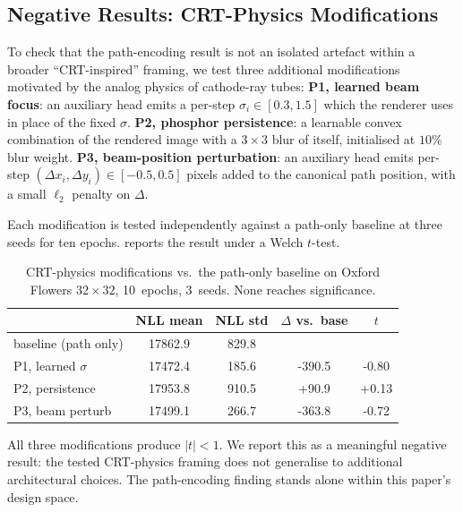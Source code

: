 \documentclass[conference]{IEEEtran}
\begin{document}
\subsection{Negative Results: CRT-Physics Modifications}\label{ssec:cnn}

To check that the path-encoding result is not an isolated
artefact within a broader ``CRT-inspired'' framing, we test three
additional modifications motivated by the analog physics of
cathode-ray tubes:
\textbf{P1, learned beam focus}: an auxiliary head emits a
per-step $\sigma_i \in [0.3, 1.5]$ which the renderer uses in place
of the fixed $\sigma$.
\textbf{P2, phosphor persistence}: a learnable convex combination
of the rendered image with a $3\times3$ blur of itself, initialised
at $10\%$ blur weight.
\textbf{P3, beam-position perturbation}: an auxiliary head emits
per-step $(\Delta x_i, \Delta y_i) \in [-0.5, 0.5]$ pixels added to
the canonical path position, with a small $\ell_2$ penalty on
$\Delta$.

Each modification is tested independently against a path-only
baseline at three seeds for ten epochs. 
reports the result under a Welch $t$-test.

\begin{table}[t]
\centering
\caption{CRT-physics modifications vs.\ the path-only baseline on
Oxford Flowers $32\times32$, 10~epochs, 3~seeds. None reaches
significance.}
\label{tab:postulates}
\begin{tabular}{l S[table-format=5.1] S[table-format=4.1]
                  S[table-format=+4.1] S[table-format=+1.2]}
\toprule
& {NLL mean} & {NLL std} & {$\Delta$ vs.\ base} & {$t$} \\
\midrule
baseline (path only) & 17862.9 & 829.8 &      &  \\
\midrule
P1, learned $\sigma$ & 17472.4 & 185.6 & -390.5 & -0.80 \\
P2, persistence      & 17953.8 & 910.5 &  +90.9 & +0.13 \\
P3, beam perturb     & 17499.1 & 266.7 & -363.8 & -0.72 \\
\bottomrule
\end{tabular}
\end{table}

All three modifications produce $|t|<1$. We report this as a
meaningful negative result: the tested CRT-physics framing does not
generalise to additional architectural choices. The path-encoding
finding stands alone within this paper's design space.

\end{document}
